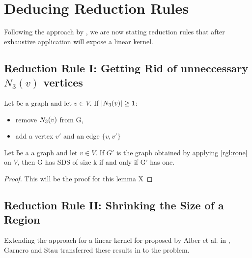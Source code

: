 \section{Deducing Reduction Rules}

Following the approach by \cite{Garnero2014}, we are now stating reduction rules that after exhaustive application will expose a linear kernel. 

\subsection{Reduction Rule I: Getting Rid of unneccessary  $N_3(v)$ vertices}

\begin{rgl}\label{rgl:rone}
    Let \G be a graph and let $v \in V$. If $\abs{N_3(v)} \geq 1$:

    \begin{itemize}
        \item remove $N_3(v)$ from G, 
        \item add a vertex $v'$ and an edge $\{v, v'\}$
    \end{itemize}
     
\end{rgl}
\begin{lemma}
    Let \G be a a graph and let $v \in V$. If $G'$ is the graph obtained by applying \cref{rgl:rone}   on $V$, then G has SDS of size k if and only if G' has one.
\end{lemma}
\begin{proof}
   This will be the proof for this lemma X 
\end{proof}


\subsection{Reduction Rule II: Shrinking the Size of a Region}


Extending the approach for a linear kernel for \dom proposed by Alber et al. in \cite{Alber2004}, Garnero and Stau transferred these results in \cite{Garnero2018} to the \tdom problem. 

